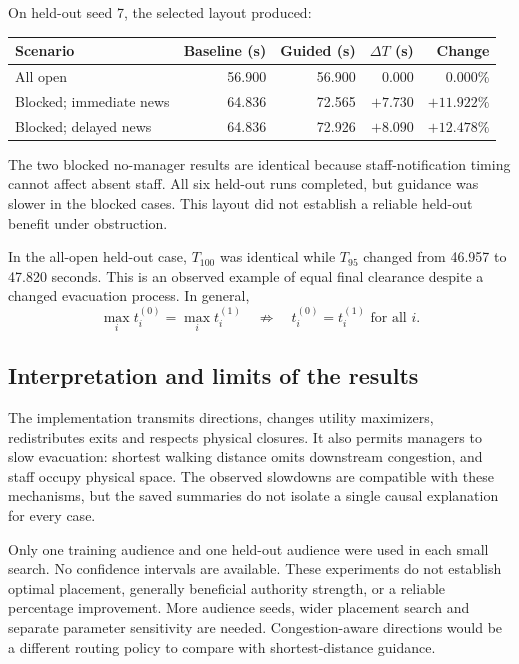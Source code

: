 \documentclass[11pt]{article}
\begin{document}
On held-out seed 7, the selected layout produced:
\begin{center}
\begin{tabular}{lrrrr}
\toprule
Scenario & Baseline (s) & Guided (s) & $\Delta T$ (s) & Change\\
\midrule
All open & 56.900 & 56.900 & 0.000 & 0.000\%\\
Blocked; immediate news & 64.836 & 72.565 & $+7.730$ & $+11.922\%$\\
Blocked; delayed news & 64.836 & 72.926 & $+8.090$ & $+12.478\%$\\
\bottomrule
\end{tabular}
\end{center}
The two blocked no-manager results are identical because staff-notification
timing cannot affect absent staff. All six held-out runs completed, but
guidance was slower in the blocked cases. This layout did not establish a
reliable held-out benefit under obstruction.

In the all-open held-out case, $T_{100}$ was identical while $T_{95}$ changed
from 46.957 to 47.820 seconds. This is an observed example of equal final
clearance despite a changed evacuation process. In general,
\[
 \max_i t_i^{(0)}=\max_i t_i^{(1)}
 \quad\not\Rightarrow\quad t_i^{(0)}=t_i^{(1)}\text{ for all }i.
\]

\subsection{Interpretation and limits of the results}
The implementation transmits directions, changes utility maximizers,
redistributes exits and respects physical closures. It also permits managers
to slow evacuation: shortest walking distance omits downstream congestion,
and staff occupy physical space. The observed slowdowns are compatible with
these mechanisms, but the saved summaries do not isolate a single causal
explanation for every case.

Only one training audience and one held-out audience were used in each small
search. No confidence intervals are available. These experiments do not
establish optimal placement, generally beneficial authority strength, or a
reliable percentage improvement. More audience seeds, wider placement search
and separate parameter sensitivity are needed. Congestion-aware directions
would be a different routing policy to compare with shortest-distance guidance.
\end{document}
